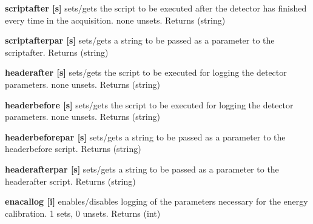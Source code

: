 \begin{DoxyItemize}
\item {\bfseries scriptafter \mbox{[}s\mbox{]}} sets/gets the script to be executed after the detector has finished every time in the acquisition. {\ttfamily none} unsets. {\ttfamily Returns} {\ttfamily }(string)
\end{DoxyItemize}


\begin{DoxyItemize}
\item {\bfseries scriptafterpar \mbox{[}s\mbox{]}} sets/gets a string to be passed as a parameter to the scriptafter. {\ttfamily Returns} {\ttfamily }(string)
\end{DoxyItemize}


\begin{DoxyItemize}
\item {\bfseries headerafter \mbox{[}s\mbox{]}} sets/gets the script to be executed for logging the detector parameters. {\ttfamily none} unsets. {\ttfamily Returns} {\ttfamily }(string)
\end{DoxyItemize}


\begin{DoxyItemize}
\item {\bfseries headerbefore \mbox{[}s\mbox{]}} sets/gets the script to be executed for logging the detector parameters. {\ttfamily none} unsets. {\ttfamily Returns} {\ttfamily }(string)
\end{DoxyItemize}


\begin{DoxyItemize}
\item {\bfseries headerbeforepar \mbox{[}s\mbox{]}} sets/gets a string to be passed as a parameter to the headerbefore script. {\ttfamily Returns} {\ttfamily }(string)
\end{DoxyItemize}


\begin{DoxyItemize}
\item {\bfseries headerafterpar \mbox{[}s\mbox{]}} sets/gets a string to be passed as a parameter to the headerafter script. {\ttfamily Returns} {\ttfamily }(string)
\end{DoxyItemize}


\begin{DoxyItemize}
\item {\bfseries enacallog \mbox{[}i\mbox{]}} enables/disables logging of the parameters necessary for the energy calibration. 1 sets, 0 unsets. {\ttfamily Returns} {\ttfamily }(int)
\end{DoxyItemize}


